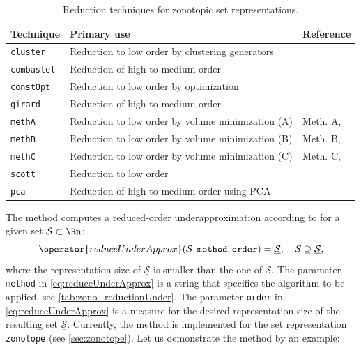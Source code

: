 \begin{table}[h]
	\caption{Reduction techniques for zonotopic set representations.}
	\centering
	\label{tab:zono_reduction}
	\begin{tabular}{lll}
		\toprule
		\textbf{Technique} & \textbf{Primary use} & \textbf{Reference} \\
		\midrule
		\texttt{cluster} & Reduction to low order by clustering generators & \cite[Sec.~III.B]{Kopetzki2017} \\
		\texttt{combastel} & Reduction of high to medium order & \cite[Sec.~3.2]{Combastel2003} \\
		\texttt{constOpt} & Reduction to low order by optimization & \cite[Sec.~III.D]{Kopetzki2017} \\
		\texttt{girard} & Reduction of high to medium order & \cite[Sec. ~.4]{Girard2005} \\
		\texttt{methA} & Reduction to low order by volume minimization (A) & Meth. A, \cite[Sec.~2.5.5]{Althoff2010a} \\
		\texttt{methB} & Reduction to low order by volume minimization (B) & Meth. B, \cite[Sec.~2.5.5]{Althoff2010a} \\
		\texttt{methC} & Reduction to low order by volume minimization (C) & Meth. C, \cite[Sec.~2.5.5]{Althoff2010a} \\
		\texttt{scott} & Reduction to low order  & \cite[Appendix]{Scott2016} \\
		\texttt{pca} & Reduction of high to medium order using PCA & \cite[Sec.~III.A]{Kopetzki2017} \\
		\bottomrule
	\end{tabular}
\end{table}


The method  computes a reduced-order underapproximation according to \cite{Luetzow2025c} for a given set $\mathcal{S} \subset \Rn$:
\begin{equation}
	\operator{reduceUnderApprox}(\mathcal{S},\texttt{method},\texttt{order}) = \underline{\mathcal{S}}, ~~~ \mathcal{S} \supseteq \underline{\mathcal{S}},
	\label{eq:reduceUnderApprox}
\end{equation}
where the representation size of $\underline{\mathcal{S}}$ is smaller than the one of $\mathcal{S}$. The parameter \texttt{method} in \eqref{eq:reduceUnderApprox} is a string that specifies the algorithm to be applied, see \cref{tab:zono_reductionUnder}. The parameter \texttt{order} in \eqref{eq:reduceUnderApprox} is a measure for the desired representation size of the resulting set $\underline{\mathcal{S}}$. Currently, the method  is implemented for the set representation \texttt{zonotope} (see \cref{sec:zonotope}). Let us demonstrate the method  by an example:

